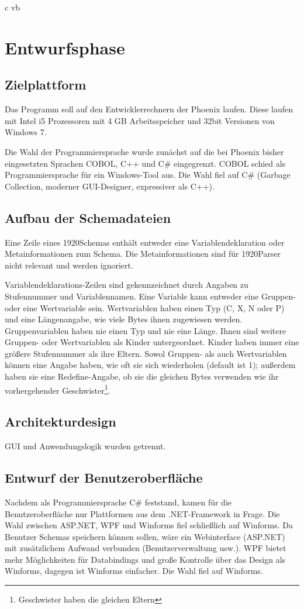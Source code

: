 c vb%
\section{Entwurfsphase} 
\label{sec:Entwurfsphase}

\subsection{Zielplattform}
\label{sec:Zielplattform}
Das Programm soll auf den Entwicklerrechnern der Phoenix laufen. Diese laufen mit  Intel i5 Prozessoren mit 4 GB Arbeitsspeicher und 32bit Versionen von Windows 7.


Die Wahl der Programmiersprache wurde zunächst auf die bei Phoenix bisher eingesetzten Sprachen COBOL, C++ und C\# eingegrenzt. COBOL schied als Programmiersprache für ein Windows-Tool aus. Die Wahl fiel auf C\# (Garbage Collection, moderner GUI-Designer, expressiver als C++).

\subsection{Aufbau der Schemadateien}
\label{sec:AufbauSchemas}
Eine Zeile eines 1920Schemas enthält entweder eine Variablendeklaration oder Metainformationen zum Schema. Die Metainformationen sind für 1920Parser nicht relevant und werden ignoriert.

Variablendeklarations-Zeilen sind gekennzeichnet durch Angaben zu Stufennummer und Variablennamen.
Eine Variable kann entweder eine Gruppen- oder eine Wertvariable sein.
Wertvariablen haben einen Typ (C, X, N oder P) und eine Längenangabe, wie viele Bytes ihnen zugewiesen werden.
Gruppenvariablen haben nie einen Typ und nie eine Länge. Ihnen sind weitere Gruppen- oder Wertvariablen als Kinder untergeordnet. Kinder haben immer eine größere Stufennummer als ihre Eltern.
Sowol Gruppen- als auch Wertvariablen können eine Angabe haben, wie oft sie sich wiederholen (default ist 1); außerdem haben sie eine Redefine-Angabe, ob sie die gleichen Bytes verwenden wie ihr vorhergehender Geschwister\footnote{Geschwister haben die gleichen Eltern}.


\subsection{Architekturdesign}
\label{sec:Architekturdesign}
GUI und Anwendungslogik wurden getrennt.


\subsection{Entwurf der Benutzeroberfläche}
\label{sec:Benutzeroberflaeche}
Nachdem als Programmiersprache C\# feststand, kamen für die Benutzeroberfläche nur  Plattformen aus dem .NET-Framework in Frage. Die Wahl zwischen ASP.NET, WPF und Winforms fiel schließlich auf Winforms. Da Benutzer Schemas speichern können sollen, wäre ein Webinterface (ASP.NET) mit zusätzlichem Aufwand verbunden (Benutzerverwaltung usw.). WPF bietet mehr Möglichkeiten für Databindings und große Kontrolle über das Design als Winforms, dagegen ist Winforms einfacher. Die Wahl fiel auf Winforms.
